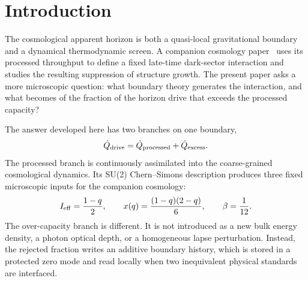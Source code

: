 \documentclass[aps,prd,twocolumn,10pt,superscriptaddress,nofootinbib]{revtex4-2}
\begin{document}
\begin{abstract}
The convention-independent observable is nonclosure of a redundant
calibration loop.  We formulate it as a register-valued graph holonomy and
prove that node-zero-point redefinitions telescope from every closed loop.
We further give a source-reduced Hamiltonian dilation of the write
instrument, a concrete caesium-clock and SI-radiometric realization of the
matter endpoints, a symmetry-complete counterterm basis, an executable
native $(M_B,a_B)$ likelihood, estimator-level reductions for sirens,
chronometers, time-delay lenses, and megamasers, and a pre-registered
bright-siren--SN closure experiment.  These results complete the minimal
low-energy construction.  The remaining frontier is empirical execution
and the question whether the exact Standard Model plus non-perturbative
time-dependent CS/WZW theory uniquely selects this minimal portal.
\end{abstract}

\maketitle



\section{Introduction}
\label{sec:intro}

The cosmological apparent horizon is both a quasi-local gravitational
boundary and a dynamical thermodynamic screen.  A companion cosmology
paper~\cite{Sayegh2026} uses its processed throughput to define a fixed
late-time dark-sector interaction and studies the resulting suppression of
structure growth.  The present paper asks a more microscopic question:
what boundary theory generates the interaction, and what becomes of the
fraction of the horizon drive that exceeds the processed capacity?

The answer developed here has two branches on one boundary,
\begin{equation}
\dot Q_{\rm drive}
=\dot Q_{\rm processed}+\dot Q_{\rm excess}.
\label{eq:two_branch_split_intro}
\end{equation}
The processed branch is continuously assimilated into the coarse-grained
cosmological dynamics.  Its SU(2) Chern--Simons description produces three
fixed microscopic inputs for the companion cosmology:
\begin{equation}
I_{\rm eff}=\frac{1-q}{2},\qquad
x(q)=\frac{(1-q)(2-q)}{6},\qquad
\beta=\frac{1}{12}.
\label{eq:three_inputs_intro}
\end{equation}
The over-capacity branch is different.  It is not introduced as a new bulk
energy density, a photon optical depth, or a homogeneous lapse perturbation.
Instead, the rejected fraction writes an additive boundary history, which
is stored in a protected zero mode and read locally when two inequivalent
physical standards are interfaced.
\end{document}
